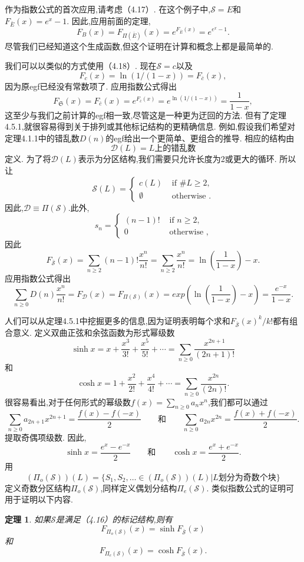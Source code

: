 \documentclass[a4paper,12pt]{ctexbook}
\newtheorem{theorem}[lemma]{\hspace{2em}定理}%
\begin{document}
作为指数公式的首次应用,请考虑（4.17）.  在这个例子中,$\mathcal{S}=E$和$F_{\bar{E}}(x)=e^x-1$.  因此,应用前面的定理,
$$F_B(x)=F_{\varPi(\bar{E})}(x)=e^{F_{\bar{E}}(x)}=e^{e^x-1}. $$
尽管我们已经知道这个生成函数,但这个证明在计算和概念上都是最简单的.  

我们可以以类似的方式使用（4.18）.  现在$\mathcal{S}=c$以及
$$F_c(x)=\ln (1/(1-x))=F_{\bar{c}}(x),$$因为原egf已经没有常数项了.  应用指数公式得出
$$
F_\mathfrak{S}(x)
=F_{\bar{c}}(x)=e^{F_{\bar{c}}(x)}=e^{\ln (1/(1-x))}=\frac{1}{1-x}
,$$
这至少与我们之前计算的egf相一致,尽管这是一种更为迂回的方法.  但有了定理4.5.1,就很容易得到关于排列或其他标记结构的更精确信息.  例如,假设我们希望对定理4.1.1中的错乱数$D(n)$的egf给出一个更简单、更组合的推导.  相应的结构由
$$\mathcal{D}(L)=L\text{上的错乱数}$$
定义. 
为了将$\mathcal{D}(L)$表示为分区结构,我们需要只允许长度为2或更大的循环.  所以让
$$
\mathcal{S}(L)=\begin{cases}
c(L) & \text { if } \#L \ge2, \\
\emptyset & \text { otherwise }. 
\end{cases} 
$$
因此,$\mathcal{D}\equiv \varPi(\mathcal{S}). $此外,
$$
s_n=\begin{cases}
(n-1)! & \text { if }n \ge2, \\
0 & \text { otherwise },
\end{cases} 
$$
因此
$$
F_{\bar{\mathcal{S}}}(x)
=\sum_{n\geq2}(n-1)!\frac{x^n}{n!}
=\sum_{n\geq2}\frac{x^n}{n!}
=\ln \left(\frac{1}{1-x}\right)-x. 
$$
应用指数公式得出
\begin{equation}
\sum_{n\geq0}D(n)\frac{x^n}{n!}
=F_{\mathcal{D}}(x)
=F_{\varPi(\mathcal{S})}(x)
=exp\left(\ln \left(\frac{1}{1-x}\right)-x\right)
=\frac{e^{-x}}{1-x}. 
\end{equation}

人们可以从定理4.5.1中挖掘更多的信息,因为证明表明每个求和$F_{\bar{\mathcal{S}}}(x)^k/k!$都有组合意义.  定义{\kaishu 双曲正弦和余弦}函数为形式幂级数
$$
\sinh x=x+\frac{x^3}{3!}+\frac{x^5}{5!}+\cdots =\sum_{n\ge0}\frac{x^{2n+1}}{(2n+1)!}
$$
和
$$
\cosh x=1+\frac{x^2}{2!}+\frac{x^4}{4!}+\cdots =\sum_{n\ge0}\frac{x^{2n}}{(2n)!}. 
$$
很容易看出,对于任何形式的幂级数$f(x)=\sum_{n\geq0}a_nx^n$,我们都可以通过
\begin{equation}
\sum_{n\ge0}a_{2n+1}x^{2n+1}=\frac{f(x)-f(-x)}{2}\quad\quad\text{和}
\quad\quad\sum_{n\ge0}a_{2n}x^{2n}=\frac{f(x)+f(-x)}{2}. 
\end{equation}
提取奇偶项级数. 因此,
\begin{equation}
\sinh x=\frac{e^x-e^{-x}}{2}\quad\quad\text{和}\quad\quad
\cosh x=\frac{e^x+e^{-x}}{2}. 
\end{equation}
用
$$
(\varPi_o(\mathcal{S}))(L)=\{
{S_1,S_2,\dots}\in(\varPi_o(\mathcal{S}))(L)|L\text{划分为奇数个块}
\}
$$
定义{\kaishu 奇数分区结构}$\varPi_o(\mathcal{S})$,同样定义{\kaishu 偶划分结构}$\varPi_e(\mathcal{S})$. 类似指数公式的证明可用于证明以下内容.  
\begin{theorem}
	如果$\mathcal{S}$是满足（4.16）的标记结构,则有
	$$
	F_{\varPi_o(\mathcal{S})}(x)
	=\sinh F_{\bar{\mathcal{S}}}(x)
	$$
	和
	$$
	F_{\varPi_e(\mathcal{S})}(x)
	=\cosh F_{\bar{\mathcal{S}}}(x). 
	$$
\end{theorem}
\end{document}
